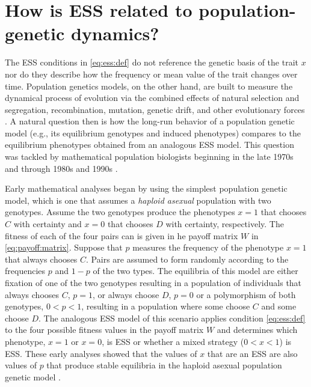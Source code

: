 \documentclass[11pt]{article}
\begin{document}
\section{How is ESS related to population-genetic dynamics?}

The ESS conditions in \eqref{eq:ess:def} do not reference the genetic basis of the trait $x$ nor do they describe how the frequency or mean value of the trait changes over time. Population genetics models, on the other hand, are built to measure the dynamical process of evolution via the combined effects of natural selection and segregation, recombination, mutation, genetic drift, and other evolutionary forces \cite{Crow:Kimura:1970,Ewens:2004}. A natural question then is how the long-run behavior of a population genetic model (e.g., its equilibrium genotypes and induced phenotypes) compares to the equilibrium phenotypes obtained from an analogous ESS model. This question was tackled by mathematical population biologists beginning in the late 1970s and through 1980s and 1990s \cite[e..g,][]{Taylor:Jonker:1978,Hofbauer:Schuster:1979,Zeeman:1980,Eshel:1982,Hofbauer:Schuster:1982,Cressman:Hines:1984,Eshel:Feldman:1984,Lessard:1984,Cressman:1988,Cressman:Hofbauer:1996,Eshel:1996,Hammerstein:1996,Weissing:1996}.

Early mathematical analyses began by using the simplest population genetic model, which is one that assumes a \textit{haploid asexual} population with two genotypes. Assume the two genotypes produce the phenotypes $x=1$ that chooses $C$ with certainty and $x=0$ that chooses $D$ with certainty, respectively. The fitness of each of the four pairs can is given in he payoff matrix $W$ in \eqref{eq:payoff:matrix}. Suppose that $p$ measures the frequency of the phenotype $x=1$ that always chooses $C$. Pairs are assumed to form randomly according to the frequencies $p$ and $1-p$ of the two types. The equilibria of this model are either fixation of one of the two genotypes resulting in a population of individuals that always chooses $C$, $p=1$, or always choose $D$, $p=0$ or a polymorphism of both genotypes, $0 < p < 1$, resulting in a population where some choose $C$ and some choose $D$. The analogous ESS model of this scenario applies condition \eqref{eq:ess:def} to the four possible fitness values in the payoff matrix $W$ and determines which phenotype, $x=1$ or $x=0$, is ESS or whether a mixed strategy ($0 < x < 1$) is ESS. These early analyses showed that the values of $x$ that are an ESS are also values of $p$ that produce stable equilibria in the haploid asexual population genetic model \cite{Taylor:Jonker:1978,Hofbauer:Schuster:1979,Zeeman:1980,Hofbauer:Sigmund:1998}.
\end{document}
